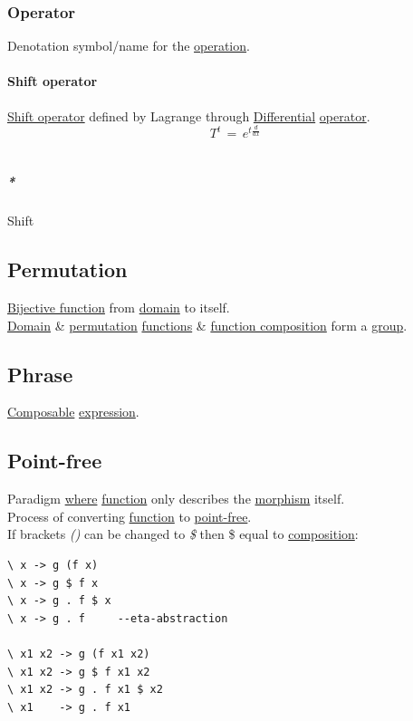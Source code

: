 \documentclass[11pt]{article}
\begin{document}
\subsubsection{\label{org95db00b}Operator}
\label{sec:orgb2dbb34}
Denotation symbol/name for the \hyperref[org87d485b]{operation}.\\

\paragraph{\label{org018408a}Shift operator}
\label{sec:org52f3fcb}
\hyperref[org018408a]{Shift operator} defined by Lagrange through \hyperref[org9428cbd]{Differential} \hyperref[org95db00b]{operator}.\\
$$ T^{t} \, = \, e^{t{\frac{d}{dx}}} $$\\

\subparagraph{\emph{*}}
\label{sec:org15c6ea3}

Shift\\

\subsection{\label{orga04f0ff}Permutation}
\label{sec:orge9f5512}
\hyperref[org052399f]{Bijective function} from \hyperref[orgf784585]{domain} to itself.\\

\hyperref[orgf784585]{Domain} \& \hyperref[orga04f0ff]{permutation} \hyperref[org66c5288]{functions} \& \hyperref[org57b44d1]{function composition} form a \hyperref[org9ef38ed]{group}.\\

\subsection{\label{org1777a39}Phrase}
\label{sec:orge951dd3}
\hyperref[org37ac081]{Composable} \hyperref[org667db83]{expression}.\\

\subsection{\label{orgb88b386}Point-free}
\label{sec:org1b6f522}
Paradigm \hyperref[orgefd1ecd]{where} \hyperref[orgeb5cddb]{function} only describes the \hyperref[orgad99fc6]{morphism} itself.\\

Process of converting \hyperref[orgeb5cddb]{function} to \hyperref[orgb88b386]{point-free}.\\
If brackets \emph{()} can be changed to \emph{\$} then \$ equal to \hyperref[org24a8abd]{composition}:\\
\begin{verbatim}
\ x -> g (f x)
\ x -> g $ f x
\ x -> g . f $ x
\ x -> g . f     --eta-abstraction

\ x1 x2 -> g (f x1 x2)
\ x1 x2 -> g $ f x1 x2
\ x1 x2 -> g . f x1 $ x2
\ x1    -> g . f x1
\end{verbatim}
\end{document}
